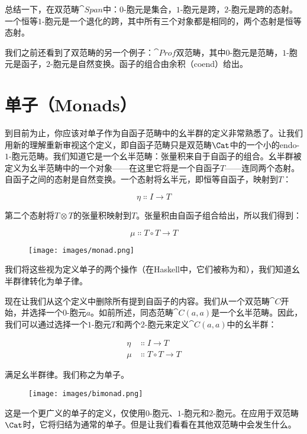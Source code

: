 \noindent
总结一下，在双范畴$\cat{Span}$中：$0$-胞元是集合，$1$-胞元是跨，$2$-胞元是跨的态射。一个恒等$1$-胞元是一个退化的跨，其中所有三个对象都是相同的，两个态射是恒等态射。

我们之前还看到了双范畴的另一个例子：$\cat{Prof}$双范畴，其中$0$-胞元是范畴，$1$-胞元是函子，$2$-胞元是自然变换。函子的组合由余积（coend）给出。

\section{单子（Monads）}

到目前为止，你应该对单子作为自函子范畴中的幺半群的定义非常熟悉了。让我们用新的理解重新审视这个定义，即自函子范畴只是双范畴$\Cat$中的一个小的endo-$1$-胞元范畴。我们知道它是一个幺半范畴：张量积来自于自函子的组合。幺半群被定义为幺半范畴中的一个对象——在这里它将是一个自函子$T$——连同两个态射。自函子之间的态射是自然变换。一个态射将幺半元，即恒等自函子，映射到$T$：

$$\eta \Colon I \to T$$

第二个态射将$T \otimes T$的张量积映射到$T$。张量积由自函子组合给出，所以我们得到：

$$\mu \Colon T \circ T \to T$$

\begin{figure}[H]
  \centering
  \texttt{[image: images/monad.png]}
\end{figure}

\noindent
我们将这些视为定义单子的两个操作（在Haskell中，它们被称为和），我们知道幺半群律转化为单子律。

现在让我们从这个定义中删除所有提到自函子的内容。我们从一个双范畴$\cat{C}$开始，并选择一个$0$-胞元$a$。如前所述，同态范畴$\cat{C}(a, a)$是一个幺半范畴。因此，我们可以通过选择一个$1$-胞元$T$和两个$2$-胞元来定义$\cat{C}(a, a)$中的幺半群：

\begin{align*}
  \eta & \Colon I \to T \\
  \mu  & \Colon T \circ T \to T
\end{align*}

满足幺半群律。我们称之为单子。

\begin{figure}[H]
  \centering
  \texttt{[image: images/bimonad.png]}
\end{figure}

\noindent
这是一个更广义的单子的定义，仅使用$0$-胞元、$1$-胞元和$2$-胞元。在应用于双范畴$\Cat$时，它将归结为通常的单子。但是让我们看看在其他双范畴中会发生什么。

